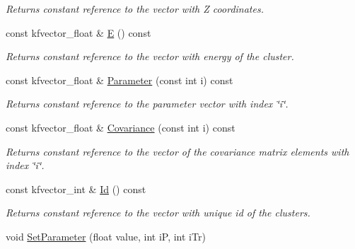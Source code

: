 \begin{DoxyCompactItemize}
\begin{DoxyCompactList}\small\item\em Returns constant reference to the vector with Z coordinates. \end{DoxyCompactList}\item 
const kfvector\+\_\+float \& \hyperlink{classKFPEmcCluster_aecd3a4a6be16f549415d55c22163239c}{E} () const \hypertarget{classKFPEmcCluster_aecd3a4a6be16f549415d55c22163239c}{}\label{classKFPEmcCluster_aecd3a4a6be16f549415d55c22163239c}

\begin{DoxyCompactList}\small\item\em Returns constant reference to the vector with energy of the cluster. \end{DoxyCompactList}\item 
const kfvector\+\_\+float \& \hyperlink{classKFPEmcCluster_a092b784c79ab49296837494e20c60fc0}{Parameter} (const int i) const \hypertarget{classKFPEmcCluster_a092b784c79ab49296837494e20c60fc0}{}\label{classKFPEmcCluster_a092b784c79ab49296837494e20c60fc0}

\begin{DoxyCompactList}\small\item\em Returns constant reference to the parameter vector with index \char`\"{}i\char`\"{}. \end{DoxyCompactList}\item 
const kfvector\+\_\+float \& \hyperlink{classKFPEmcCluster_aaf46ecf1ebe6e400e758df799780c6f2}{Covariance} (const int i) const \hypertarget{classKFPEmcCluster_aaf46ecf1ebe6e400e758df799780c6f2}{}\label{classKFPEmcCluster_aaf46ecf1ebe6e400e758df799780c6f2}

\begin{DoxyCompactList}\small\item\em Returns constant reference to the vector of the covariance matrix elements with index \char`\"{}i\char`\"{}. \end{DoxyCompactList}\item 
const kfvector\+\_\+int \& \hyperlink{classKFPEmcCluster_aa9356363659ef5dbae4dc75e108f685f}{Id} () const \hypertarget{classKFPEmcCluster_aa9356363659ef5dbae4dc75e108f685f}{}\label{classKFPEmcCluster_aa9356363659ef5dbae4dc75e108f685f}

\begin{DoxyCompactList}\small\item\em Returns constant reference to the vector with unique id of the clusters. \end{DoxyCompactList}\item 
void \hyperlink{classKFPEmcCluster_ae29a45ef988a32825804dcdbad554ff1}{Set\+Parameter} (float value, int iP, int i\+Tr)\hypertarget{classKFPEmcCluster_ae29a45ef988a32825804dcdbad554ff1}{}\label{classKFPEmcCluster_ae29a45ef988a32825804dcdbad554ff1}


\end{DoxyCompactItemize}
